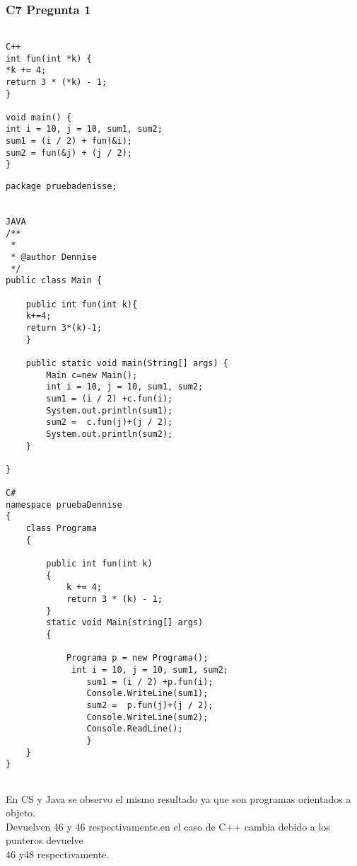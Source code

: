 \subsubsection{C7 Pregunta 1}

\begin{lstlisting}

C++
int fun(int *k) {
*k += 4;
return 3 * (*k) - 1;
}

void main() {
int i = 10, j = 10, sum1, sum2;
sum1 = (i / 2) + fun(&i);
sum2 = fun(&j) + (j / 2);
}

 \end{lstlisting}

\begin{lstlisting}
package pruebadenisse;


JAVA
/**
 *
 * @author Dennise
 */
public class Main {

    public int fun(int k){
    k+=4;
    return 3*(k)-1;
    }
    
    public static void main(String[] args) {
        Main c=new Main();
        int i = 10, j = 10, sum1, sum2;
        sum1 = (i / 2) +c.fun(i);
        System.out.println(sum1);
        sum2 =  c.fun(j)+(j / 2);
        System.out.println(sum2);
    }
    
}

C#
namespace pruebaDennise
{
    class Programa
    {

        public int fun(int k)
        {
            k += 4;
            return 3 * (k) - 1;
        }
        static void Main(string[] args)
        {

            Programa p = new Programa();
             int i = 10, j = 10, sum1, sum2;
                sum1 = (i / 2) +p.fun(i);
                Console.WriteLine(sum1);
                sum2 =  p.fun(j)+(j / 2);
                Console.WriteLine(sum2);
                Console.ReadLine();
                }
    }
}


 \end{lstlisting}
En CS y Java se observo el mismo resultado ya que son programas orientados a objeto. \\
Devuelven 46 y 46 respectivamente.en el caso de C++ cambia debido a los punteros devuelve\\
46 y48 respectivamente.

